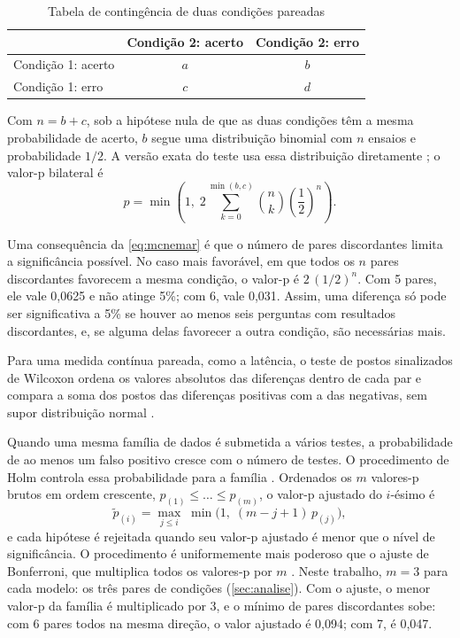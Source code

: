 \begin{table}[htb]
  \centering
  \caption{Tabela de contingência de duas condições pareadas}
  \label{tab:contingencia}
  \begin{tabular}{lcc}
    \toprule
    & Condição 2: acerto & Condição 2: erro \\
    \midrule
    Condição 1: acerto & $a$ & $b$ \\
    Condição 1: erro   & $c$ & $d$ \\
    \bottomrule
  \end{tabular}
\end{table}

Com $n = b + c$, sob a hipótese nula de que as duas condições têm a mesma
probabilidade de acerto, $b$ segue uma distribuição binomial com $n$
ensaios e probabilidade $1/2$. A versão exata do teste usa essa
distribuição diretamente \cite{fagerland2013mcnemar}; o valor-p bilateral
é
\begin{equation}
  p = \min\left(1,\; 2 \sum_{k=0}^{\min(b,c)} \binom{n}{k}
      \left(\frac{1}{2}\right)^{n}\right).
  \label{eq:mcnemar}
\end{equation}

Uma consequência da \autoref{eq:mcnemar} é que o número de pares
discordantes limita a significância possível. No caso mais favorável, em
que todos os $n$ pares discordantes favorecem a mesma condição, o valor-p
é $2\,(1/2)^{n}$. Com 5 pares, ele vale 0,0625 e não atinge 5\%; com 6,
vale 0,031. Assim, uma diferença só pode ser significativa a 5\% se houver
ao menos seis perguntas com resultados discordantes, e, se alguma delas
favorecer a outra condição, são necessárias mais.

Para uma medida contínua pareada, como a latência, o teste de postos
sinalizados de Wilcoxon ordena os valores absolutos das diferenças dentro
de cada par e compara a soma dos postos das diferenças positivas com a das
negativas, sem supor distribuição normal \cite{wilcoxon1945individual}.

Quando uma mesma família de dados é submetida a vários testes, a
probabilidade de ao menos um falso positivo cresce com o número de testes.
O procedimento de Holm controla essa probabilidade para a família
\cite{holm1979simple}. Ordenados os $m$ valores-p brutos em ordem crescente,
$p_{(1)} \le \dots \le p_{(m)}$, o valor-p ajustado do $i$-ésimo é
\begin{equation}
  \tilde{p}_{(i)} = \max_{j \le i}\; \min\bigl(1,\; (m - j + 1)\, p_{(j)}\bigr),
  \label{eq:holm}
\end{equation}
e cada hipótese é rejeitada quando seu valor-p ajustado é menor que o
nível de significância. O procedimento é uniformemente mais poderoso que
o ajuste de Bonferroni, que multiplica todos os valores-p por $m$
\cite{shaffer1986modified}. Neste trabalho, $m = 3$ para cada modelo: os três
pares de condições (\autoref{sec:analise}). Com o ajuste, o menor valor-p
da família é multiplicado por 3, e o mínimo de pares discordantes sobe:
com 6 pares todos na mesma direção, o valor ajustado é 0,094; com 7, é
0,047.

